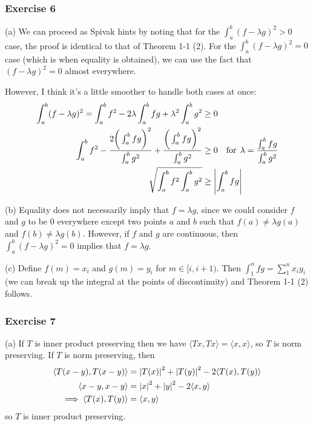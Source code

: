\subsubsection{Exercise 6}
(a) We can proceed as Spivak hints by noting that for the $\int_{a}^{b} (f - \lambda g)^2 > 0$ case, the
proof is identical to that of Theorem 1-1 (2). For the $\int_{a}^{b} (f - \lambda g)^2 = 0$ case (which is when equality is obtained), we
can use the fact that $(f - \lambda g)^2 = 0$ almost everywhere.

However, I think it's a little smoother to handle both cases at once:
\begin{align*}
        \int_{a}^{b} (f - \lambda g)^2 = \int_{a}^{b} f^2 - 2\lambda \int_{a}^{b} fg + \lambda^2 \int_{a}^{b} g^2 &\geq 0 \\ 
        \int_{a}^{b} f^2 - \frac{2 \bigg(\int_{a}^{b} fg\bigg)^2}{\int_{a}^{b} g^2} + \frac{\bigg(\int_{a}^{b} fg\bigg)^2}{\int_{a}^{b} g^2} &\geq 0 \quad \text{for} \: \: \lambda = \frac{\int_{a}^{b} fg}{\int_{a}^{b} g^2} \\
        \sqrt{\int_{a}^{b} f^2 \int_{a}^{b} g^2} &\geq \abs{\int_{a}^{b} fg}
\end{align*}

(b) Equality does not necessarily imply that $f = \lambda g$, since we could consider $f$ and $g$ to be
0 everywhere except two points $a$ and $b$ such that $f(a) \neq \lambda g(a)$ and $f(b) \neq \lambda g(b)$.
However, if $f$ and $g$ are continuous, then $\int_{a}^{b} (f - \lambda g)^2 = 0$ implies that $f = \lambda g$.

(c) Define $f(m) = x_i$ and $g(m) = y_i$ for $m \in [i, i + 1)$. Then $\int_{1}^{n} f g = \sum_{1}^n x_i y_i$ 
(we can break up the integral at the points of discontinuity) and Theorem 1-1 (2) follows.

\subsubsection{Exercise 7}
(a) If $T$ is inner product preserving then we have $\langle Tx, Tx \rangle = \langle x, x \rangle$, so
$T$ is norm preserving. If $T$ is norm preserving, then
\begin{align*}
        \langle T(x - y), T(x - y) \rangle &= \abs{T(x)}^2 + \abs{T(y)}^2 - 2\langle T(x), T(y) \rangle \\
        \langle x - y, x - y \rangle &= \abs{x}^2 + \abs{y}^2 - 2 \langle x, y \rangle \\
        \implies \langle T(x), T(y) \rangle &= \langle x, y \rangle
\end{align*}
so $T$ is inner product preserving.

